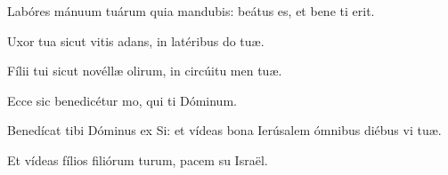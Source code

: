 \item {}

\item Labóres mánuum tuárum quia mandubis:\psstar{} beátus es, et bene ti erit.

\item Uxor tua sicut vitis adans,\psstar{} in latéribus do tuæ.

\item Fílii tui sicut novéllæ olirum,\psstar{} in circúitu men tuæ.

\item Ecce sic benedicétur mo,\psstar{} qui ti Dóminum.

\item Benedícat tibi Dóminus ex Si:\psstar{} et vídeas bona Ierúsalem ómnibus diébus vi tuæ.

\item Et vídeas fílios filiórum turum,\psstar{} pacem su Israël.
